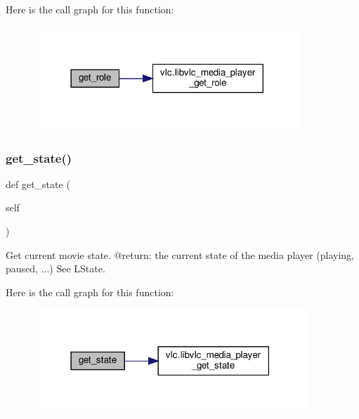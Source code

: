  Here is the call graph for this function\+:
\nopagebreak
\begin{figure}[H]
\begin{center}
\leavevmode
\includegraphics[width=285pt]{classvlc_1_1_media_player_a6f286402bd3fdd0b7b69deeb71870300_cgraph}
\end{center}
\end{figure}
\mbox{\label{classvlc_1_1_media_player_adf1f4fd59e6ea40d38c2b677a757007f}} 
\subsubsection{\texorpdfstring{get\+\_\+state()}{get\_state()}}
{\footnotesize\ttfamily def get\+\_\+state (\begin{DoxyParamCaption}\item[{}]{self }\end{DoxyParamCaption})}

\begin{DoxyVerb}Get current movie state.
@return: the current state of the media player (playing, paused, ...) See L{State}.
\end{DoxyVerb}
 Here is the call graph for this function\+:
\nopagebreak
\begin{figure}[H]
\begin{center}
\leavevmode
\includegraphics[width=291pt]{classvlc_1_1_media_player_adf1f4fd59e6ea40d38c2b677a757007f_cgraph}
\end{center}
\end{figure}
\mbox{\label{classvlc_1_1_media_player_a1d6ad4954dd4e8488d5cc7dcfceb2faa}} 
